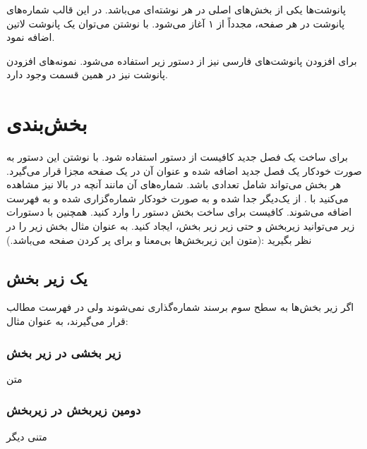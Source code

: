  پانوشت‌‌ها یکی از بخش‌های اصلی در هر نوشته‌ای می‌باشد. در این قالب شماره‌های پانوشت در هر صفحه، مجدداً از ۱ آغاز می‌شود.  با نوشتن
 \RTL{} \noindent
  می‌توان یک پانوشت لاتین اضافه نمود.
 \par
برای افزودن پانوشت‌های فارسی نیز از دستور زیر استفاده می‌شود.
 \RTL{} \noindent
نمونه‌های افزودن پانوشت نیز در همین قسمت وجود دارد.






\section{بخش‌بندی}
برای ساخت یک فصل جدید کافیست از دستور
 \RTL{} \noindent
استفاده شود. با نوشتن این دستور به صورت خودکار یک فصل جدید اضافه شده و عنوان آن در یک صفحه مجزا قرار می‌گیرد.
هر بخش می‌تواند شامل تعدادی  باشد. شماره‌های آن مانند آنچه در بالا نیز مشاهده می‌کنید با . از یک‌دیگر جدا شده و به صورت خودکار شماره‌گزاری  شده و به فهرست اضافه می‌شوند. کافیست برای ساخت بخش دستور 
 \RTL{}\noindent
را وارد کنید. همچنین با دستورات زیر می‌توانید زیربخش و حتی زیر زیر بخش، ایجاد کنید.
 \RTL{}
 \RTL{}\noindent
به عنوان مثال بخش زیر را در نظر بگیرید :(متون این زیربخش‌ها بی‌معنا و برای پر کردن صفحه می‌باشد.)

\subsection{یک زیر بخش}
اگر زیر بخش‌ها به سطح سوم برسند شماره‌گذاری نمی‌شوند ولی در فهرست مطالب قرار می‌گیرند، به عنوان مثال:
\subsubsection{زیر بخشی در زیر بخش}
متن
\subsubsection{ دومین زیربخش در زیربخش}
متنی دیگر

